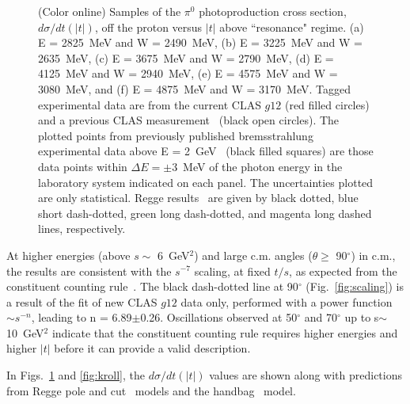 \documentclass[aps,prc,twocolumn,floatfix,showpacs,preprintnumbers,amsmath,amssymb,superscriptaddress,linenumbers]{revtex4-1}
\begin{document}
\begin{figure}[htb!]
        \caption {(Color online) Samples of the $\pi^0$ photoproduction 
	cross section, $d\sigma/dt(|t|)$, off the proton versus $|t|$ 
	above ``resonance" regime.  
	(a) E = 2825~MeV and W = 2490~MeV, 
	(b) E = 3225~MeV and W = 2635~MeV,
	(c) E = 3675~MeV and W = 2790~MeV, 
	(d) E = 4125~MeV and W = 2940~MeV,
	(e) E = 4575~MeV and W = 3080~MeV, and
	(f) E = 4875~MeV and W = 3170~MeV.
	Tagged experimental data are from the current CLAS $g12$ (red 
	filled circles) and a previous CLAS 
	measurement~\protect\cite{Dugger:2007bt} (black open circles). 
	The plotted points from previously published bremsstrahlung 
	experimental data above E = 2~GeV~\protect\cite{brem} (black 
	filled squares) are those data points within $\Delta E = 
	\pm$3~MeV of the photon energy in the laboratory system 
	indicated on each panel. The uncertainties plotted are only 
	statistical. 
	Regge results~\protect\cite{Goldstein:1973xn,Laget:2005be,
	Mathieu:2015eia,Donnachie:2015jaa} are given by black dotted, 
	blue short dash-dotted, green long dash-dotted, and magenta 
	long dashed lines, respectively.} 
	\label{fig:t_data}
\end{figure}


At higher energies (above $s\sim$ 6~GeV$^2$) and large c.m. angles 
($\theta\geq$ 90$^\circ$) in c.m., the results are consistent with 
the $s^{-7}$ scaling, at fixed $t/s$, as expected from the 
constituent counting rule~\cite{Brodsky:1973kr}. 
The black dash-dotted line at 90$^\circ$ (Fig.~\ref{fig:scaling}) 
is a result of the fit of new CLAS $g12$ data only, performed with a 
power function $\sim s^{-n}$, leading to n = 6.89$\pm$0.26.  
Oscillations observed at 50$^\circ$ and 70$^\circ$ up to 
s$\sim$10~GeV$^2$ indicate that the constituent 
counting rule requires higher energies and higher $|t|$ before it 
can provide a valid description.


In Figs.~\ref{fig:t_data} and \ref{fig:kroll}, the 
$d\sigma/dt(|t|)$ values are shown along with predictions from 
Regge pole and cut~\cite{Goldstein:1973xn,Laget:2005be,
Mathieu:2015eia,Donnachie:2015jaa} models and the 
handbag~\cite{Huang:2000kd} model. 
\end{document}
